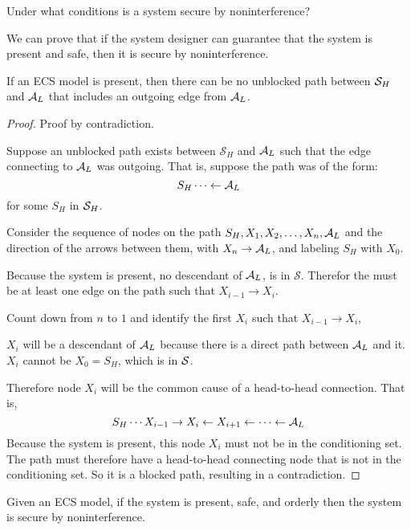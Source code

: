\documentclass[../thesis.tex]{subfiles}
\begin{document}
Under what conditions is a system secure by noninterference?

We can prove that if the system designer can guarantee
that the system is present and safe, then it is secure
by noninterference.

\begin{lem}
  \label{lem:present}
  If an ECS model is present,
  then there can be no unblocked path between
  $\mathcal{S}_H$ and $\mathcal{A}_L$ that includes an outgoing
  edge from $\mathcal{A}_L$.
\end{lem}
\begin{proof}
  Proof by contradiction.
  
  Suppose an unblocked path exists
  between $\mathcal{S}_H$ and $\mathcal{A}_L$
  such that the edge connecting to $\mathcal{A}_L$ was outgoing.
  That is, suppose the path was of the form:
  $$S_H \cdots \leftarrow \mathcal{A}_L$$
  for some $S_H$ in $\mathcal{S}_H$.

  Consider the sequence of nodes on the path
  $S_H, X_1, X_2, \ldots, X_n, \mathcal{A}_L$ and the direction of
  the arrows between them, with $X_n \rightarrow \mathcal{A}_L$,
  and labeling
  $S_H$ with $X_0$.

  Because the system is present, no descendant of $\mathcal{A}_L$,
  is in $\mathcal{S}$.
  Therefor the must be at least one edge on the path
  such that $X_{i-1} \rightarrow X_i$.

  Count down from $n$ to $1$ and identify the first
  $X_i$ such that $X_{i-1} \rightarrow X_i$, 
 
  $X_i$ will be a descendant of $\mathcal{A}_L$ because
  there is a direct path between $\mathcal{A}_L$ and it.
  $X_i$ cannot be $X_0 = S_H$, which is in $\mathcal{S}$.

  Therefore node $X_i$ will be the common cause of a
  head-to-head connection.  That is,
  \[S_H \cdots X_{i-1} \rightarrow X_i \leftarrow X_{i+1} \leftarrow \cdots \leftarrow \mathcal{A}_L \]
  Because the system is present, this node
  $X_i$ must not be in the conditioning set.
  The path must therefore have a head-to-head
  connecting node that is not in the conditioning
  set.
  So it is a blocked path, resulting in a contradiction.
\end{proof}

\begin{thm}
  \label{thm:ecs-noninterference}
  Given an ECS model,
  if the system is present, safe, and orderly
  then the system
  is secure by noninterference.
\end{thm}
\end{document}
